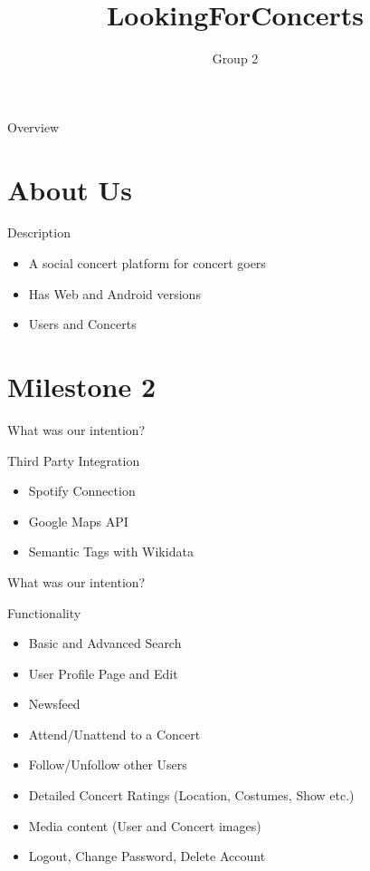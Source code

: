 \documentclass{beamer}
\title[LookingForConcerts]{LookingForConcerts}
\author[]{Group 2}
\date
  {}
\institute
  {}
\begin{document}
\maketitle

\begin{frame}{Overview}

  \tableofcontents

\end{frame}

\section{About Us}

\begin{frame}{Description}
	\begin{block}{}
		\begin{itemize}
		\item A social concert platform for concert goers
		\item Has Web and Android versions
		\item Users and Concerts
		\end{itemize}
	\end{block}		
	
\end{frame}

\section{Milestone 2}

\begin{frame}{What was our intention?}
  \begin{block}{Third Party Integration}
    \begin{itemize}
  	\item Spotify Connection
  	\item Google Maps API
  	\item Semantic Tags with Wikidata
    \end{itemize}
  \end{block}
  
  
\end{frame}

\begin{frame}{What was our intention?}
	\begin{block}{Functionality}
	  	\begin{itemize}
	  		\item Basic and Advanced Search
	  		\item User Profile Page and Edit
			\item Newsfeed
	  		\item Attend/Unattend to a Concert
	  		\item Follow/Unfollow other Users
	  		\item Detailed Concert Ratings (Location, Costumes, Show etc.)
	  		\item Media content (User and Concert images)
	  		\item Logout, Change Password, Delete Account
	  	\end{itemize}
	\end{block}
\end{frame}
\end{document}
